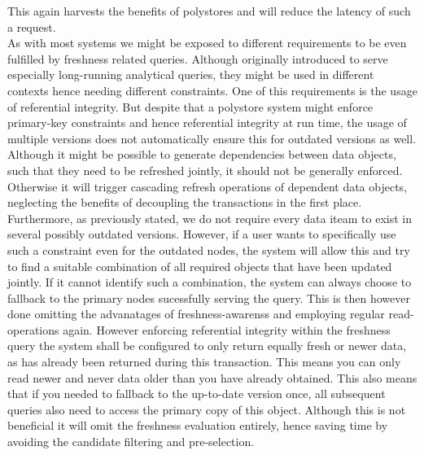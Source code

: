This again harvests the benefits of polystores and will reduce the latency of such a request.\\
As with most systems we might be exposed to different requirements to be even fulfilled by freshness related queries. 
Although originally introduced to serve especially long-running analytical queries, they might be used in different contexts hence needing different constraints.
One of this requirements is the usage of referential integrity.
But despite that a polystore system might enforce primary-key constraints and hence referential integrity at run time, the usage of multiple versions does not automatically
ensure this for outdated versions as well. Although it might be possible to generate dependencies between data objects, such that they need to be refreshed jointly,
it should not be generally enforced. Otherwise it will trigger cascading refresh operations of dependent data objects, neglecting the benefits of decoupling the transactions 
in the first place. Furthermore, as previously stated, we do not require every data iteam to exist in several possibly outdated versions.  
However, if a user wants to specifically use such a constraint even for the outdated nodes, the system will allow this and try to find a suitable combination of all required 
objects that have been updated jointly. If it cannot identify such a combination, the system can always choose to fallback to the primary nodes sucessfully serving the query.
This is then however done omitting the advanatages of freshness-awarenss and employing regular read-operations again.
However enforcing referential integrity within the freshness query the system shall be configured to only return equally fresh or newer data, 
as has already been returned during this transaction. This means you can only read newer and never data older than you have already obtained.
This also means that if you needed to fallback to the up-to-date version once, all subsequent queries also need to access the primary copy of this object. 
Although this is not beneficial it will omit the freshness evaluation entirely, hence saving time by avoiding the candidate filtering and pre-selection.

